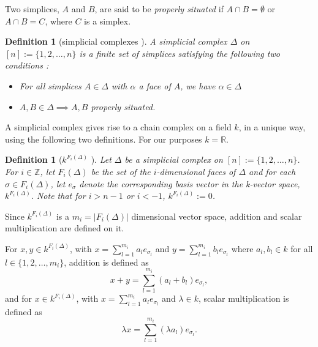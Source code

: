 \documentclass[11pt,a4paper,twoside]{report}
\newtheorem{mydef}[mythm]{Definition}
\begin{document}
Two simplices, $A$ and $B$, are said to be \textit{properly situated} if $A\cap B=\emptyset$ or $A\cap B = C$, where $C$ is a simplex.\cite{Nadathur}

\begin{mydef}[simplicial complexes \cite{Nadathur}]\label{def:simplicial_complexes}
A simplicial complex $\Delta$ on $[n] := \{1,2,\dots ,n\}$ is a finite set of simplices satisfying the following two conditions :
\begin{itemize}
\item For all simplices $A\in\Delta$ with $\alpha$ a face of $A$, we have $\alpha\in\Delta$
\item $A,B\in\Delta\implies A, B $ properly situated.
\end{itemize}
\end{mydef}

A simplicial complex gives rise to a chain complex on a field $k$, in a unique way, using the following two definitions. For our purposes $k=\mathbb{R}$.

\begin{mydef}[$k^{F_i(\Delta)}$ \cite{Allgaier}]
Let $\Delta$ be a simplicial complex on $[n] := \{1,2,\dots ,n\}$. For $i\in \mathbb{Z}$, let $F_i(\Delta)$ be the set of the $i$-dimensional faces of $\Delta$ and for each $\sigma\in F_i(\Delta)$, let $e_{\sigma}$ denote the corresponding basis vector in the k-vector space, $k^{F_i(\Delta)}$. Note that for $i>n-1$ or $i<-1$, $k^{F_i(\Delta)}:=0$.
\end{mydef}

Since $k^{F_i(\Delta)}$ is a $m_i = |F_i(\Delta)|$ dimensional vector space, addition and scalar multiplication are defined on it.

For $x,y\in k^{F_i(\Delta)}$, with $x = \sum_{l=1}^{m_i}a_le_{\sigma_l}$ and $y = \sum_{l=1}^{m_i}b_le_{\sigma_l}$ where $a_l,b_l\in k$ for all $l\in\{1,2,\dots,m_i\}$, addition is defined as 
\begin{equation*}
x+y = \sum_{l=1}^{m_i}(a_l+b_l)e_{\sigma_l},
\end{equation*}
and for $x\in k^{F_i(\Delta)}$, with $x = \sum_{l=1}^{m_i}a_le_{\sigma_l}$ and $\lambda \in k$, scalar multiplication is defined as 
\begin{equation*}
\lambda x = \sum_{l=1}^{m_i}(\lambda a_l)e_{\sigma_l}.
\end{equation*}
\end{document}
